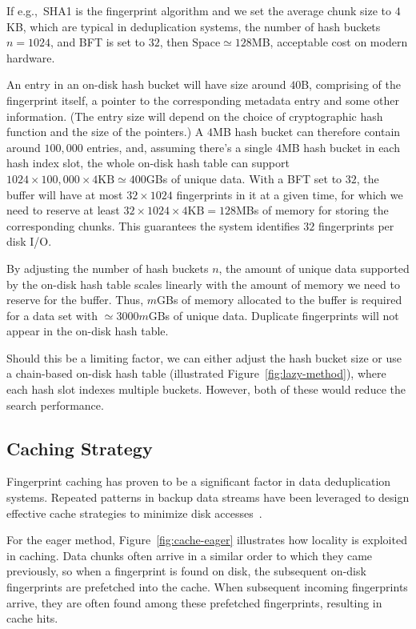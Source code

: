 \documentclass[prodmode,acmtecs]{acmsmall}
\begin{document}
If e.g.,\ SHA1 is the fingerprint algorithm and we set the average chunk size to $4$KB, which are typical in deduplication systems, the number of hash buckets $n=1024$, and BFT is set to $32$, then $\mathrm{Space} \simeq 128$MB, acceptable cost on modern hardware.


An entry in an on-disk hash bucket will have size around $40$B, comprising of the fingerprint itself, a pointer to the corresponding metadata entry and some other information. (The entry size will depend on the choice of cryptographic hash function and the size of the pointers.)  A $4$MB hash bucket can therefore contain around $100{,}000$ entries, and, assuming there's a single $4$MB hash bucket in each hash index slot, the whole on-disk hash table can support $1024 \times 100,000 \times 4\text{KB} \simeq 400$GBs of unique data.  With a BFT set to $32$, the buffer will have at most $32 \times 1024$ fingerprints in it at a given time, for which we need to reserve at least $32 \times 1024 \times 4\text{KB}=128$MBs of memory for storing the corresponding chunks. This guarantees the system identifies $32$ fingerprints per disk I/O.

By adjusting the number of hash buckets $n$, the amount of unique data supported by the on-disk hash table scales linearly with the amount of memory we need to reserve for the buffer.  Thus, $m$GBs of memory allocated to the buffer is required for a data set with $\simeq 3000m$GBs of unique data.  Duplicate fingerprints will not appear in the on-disk hash table.

Should this be a limiting factor, we can either adjust the hash bucket size or use a chain-based on-disk hash table (illustrated Figure~\ref{fig:lazy-method}), where each hash slot indexes multiple buckets.  However, both of these would reduce the search performance.


\subsection{Caching Strategy}

Fingerprint caching has proven to be a significant factor in data deduplication systems. Repeated patterns in backup data streams have been leveraged to design effective cache strategies to minimize disk accesses~\cite{bhagwat2009extreme,guo2011building,lillibridge2009sparse,manber1994finding,xia2011silo,zhu2008avoiding}.

For the eager method, Figure~\ref{fig:cache-eager} illustrates how locality is exploited in caching.  Data chunks often arrive in a similar order to which they came previously, so when a fingerprint is found on disk, the subsequent on-disk fingerprints are prefetched into the cache. When subsequent incoming fingerprints arrive, they are often found among these prefetched fingerprints, resulting in cache hits.
\end{document}
